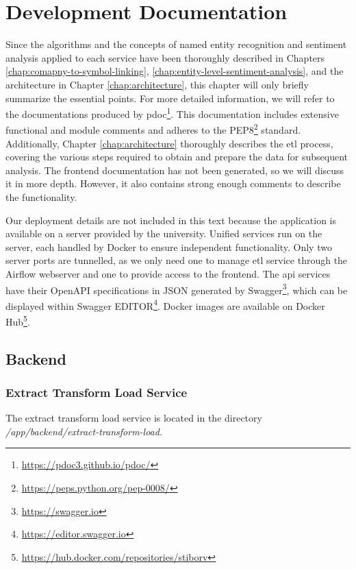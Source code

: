 \chapter{Development Documentation}
\label{chap:development-documentation}
Since the algorithms and the concepts of named entity recognition and sentiment analysis applied to each service have been thoroughly described in Chapters \ref{chap:comapny-to-symbol-linking}, \ref{chap:entity-level-sentiment-analysis}, and the architecture in Chapter \ref{chap:architecture}, this chapter will only briefly summarize the essential points. For more detailed information, we will refer to the documentations produced by pdoc\footnote{\href{https://pdoc3.github.io/pdoc/}{https://pdoc3.github.io/pdoc/}}. This documentation includes extensive functional and module comments and adheres to the PEP8\footnote{\href{https://peps.python.org/pep-0008/}{https://peps.python.org/pep-0008/}} standard. Additionally, Chapter \ref{chap:architecture} thoroughly describes the \acrshort{etl} process, covering the various steps required to obtain and prepare the data for subsequent analysis. The frontend documentation has not been generated, so we will discuss it in more depth. However, it also contains strong enough comments to describe the functionality.

Our deployment details are not included in this text because the application is available on a server provided by the university. Unified services run on the server, each handled by Docker to ensure independent functionality. Only two server ports are tunnelled, as we only need one to manage \acrshort{etl} service through the Airflow webserver and one to provide access to the frontend. The \acrshort{api} services have their OpenAPI specifications in JSON generated by Swagger\footnote{\href{https://swagger.io}{https://swagger.io}}, which can be displayed within Swagger EDITOR\footnote{\href{https://editor.swagger.io}{https://editor.swagger.io}}. Docker images are available on Docker Hub\footnote{\href{https://hub.docker.com/repositories/stiborv}{https://hub.docker.com/repositories/stiborv}}.

\section{Backend}
\label{sec:development-backend}

\subsection{Extract Transform Load Service}
\label{subsec:development-etl}
The extract transform load service is located in the directory \textit{/app/backend/}\textit{extract-transform-load}.

